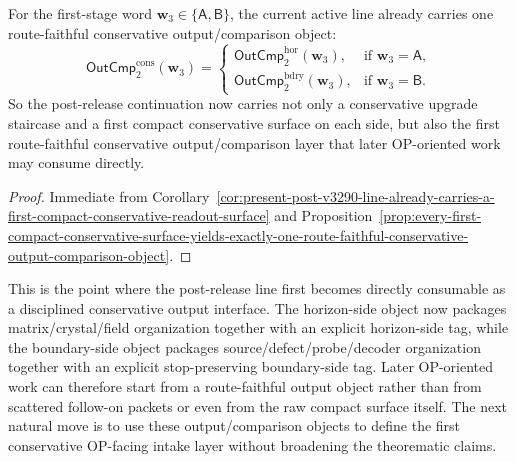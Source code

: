 \begin{corollary}
\label{cor:the-present-post-v3290-line-already-carries-a-first-route-faithful-conservative-output-comparison-layer}
For the first-stage word \(\mathbf w_3\in\{\mathsf A,\mathsf B\}\), the current active line already carries one route-faithful conservative output/comparison object:
\[
 \mathsf{OutCmp}^{\mathrm{cons}}_{2}(\mathbf w_3)
 =
 \begin{cases}
 \mathsf{OutCmp}^{\mathrm{hor}}_{2}(\mathbf w_3), & \text{if }\mathbf w_3=\mathsf A,\\[2mm]
 \mathsf{OutCmp}^{\mathrm{bdry}}_{2}(\mathbf w_3), & \text{if }\mathbf w_3=\mathsf B.
 \end{cases}
\]
So the post-release continuation now carries not only a conservative upgrade staircase and a first compact conservative surface on each side, but also the first route-faithful conservative output/comparison layer that later OP-oriented work may consume directly.
\end{corollary}

\begin{proof}
Immediate from Corollary~\ref{cor:present-post-v3290-line-already-carries-a-first-compact-conservative-readout-surface} and Proposition~\ref{prop:every-first-compact-conservative-surface-yields-exactly-one-route-faithful-conservative-output-comparison-object}.
\end{proof}

\begin{remark}
\label{rem:what-the-first-route-faithful-conservative-output-comparison-layer-now-buys}
This is the point where the post-release line first becomes directly consumable as a disciplined conservative output interface. The horizon-side object now packages matrix/crystal/field organization together with an explicit horizon-side tag, while the boundary-side object packages source/defect/probe/decoder organization together with an explicit stop-preserving boundary-side tag. Later OP-oriented work can therefore start from a route-faithful output object rather than from scattered follow-on packets or even from the raw compact surface itself. The next natural move is to use these output/comparison objects to define the first conservative OP-facing intake layer without broadening the theorematic claims.
\end{remark}


